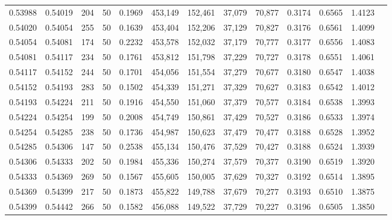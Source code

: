 \begin{tabular}{rrrrrrrrrrrrr}
0.53988 & 0.54019 &   204 &  50 &                                     0.1969 & 453,149 & 152,461 &  37,079 &  70,877 & 0.3174 & 0.6565 & 1.4123 \\
0.54020 & 0.54054 &   255 &  50 &                                     0.1639 & 453,404 & 152,206 &  37,129 &  70,827 & 0.3176 & 0.6561 & 1.4099 \\
0.54054 & 0.54081 &   174 &  50 &                                     0.2232 & 453,578 & 152,032 &  37,179 &  70,777 & 0.3177 & 0.6556 & 1.4083 \\
0.54081 & 0.54117 &   234 &  50 &                                     0.1761 & 453,812 & 151,798 &  37,229 &  70,727 & 0.3178 & 0.6551 & 1.4061 \\
0.54117 & 0.54152 &   244 &  50 &                                     0.1701 & 454,056 & 151,554 &  37,279 &  70,677 & 0.3180 & 0.6547 & 1.4038 \\
0.54152 & 0.54193 &   283 &  50 &                                     0.1502 & 454,339 & 151,271 &  37,329 &  70,627 & 0.3183 & 0.6542 & 1.4012 \\
0.54193 & 0.54224 &   211 &  50 &                                     0.1916 & 454,550 & 151,060 &  37,379 &  70,577 & 0.3184 & 0.6538 & 1.3993 \\
0.54224 & 0.54254 &   199 &  50 &                                     0.2008 & 454,749 & 150,861 &  37,429 &  70,527 & 0.3186 & 0.6533 & 1.3974 \\
0.54254 & 0.54285 &   238 &  50 &                                     0.1736 & 454,987 & 150,623 &  37,479 &  70,477 & 0.3188 & 0.6528 & 1.3952 \\
0.54285 & 0.54306 &   147 &  50 &                                     0.2538 & 455,134 & 150,476 &  37,529 &  70,427 & 0.3188 & 0.6524 & 1.3939 \\
0.54306 & 0.54333 &   202 &  50 &                                     0.1984 & 455,336 & 150,274 &  37,579 &  70,377 & 0.3190 & 0.6519 & 1.3920 \\
0.54333 & 0.54369 &   269 &  50 &                                     0.1567 & 455,605 & 150,005 &  37,629 &  70,327 & 0.3192 & 0.6514 & 1.3895 \\
0.54369 & 0.54399 &   217 &  50 &                                     0.1873 & 455,822 & 149,788 &  37,679 &  70,277 & 0.3193 & 0.6510 & 1.3875 \\
0.54399 & 0.54442 &   266 &  50 &                                     0.1582 & 456,088 & 149,522 &  37,729 &  70,227 & 0.3196 & 0.6505 & 1.3850 \\

\end{tabular}
